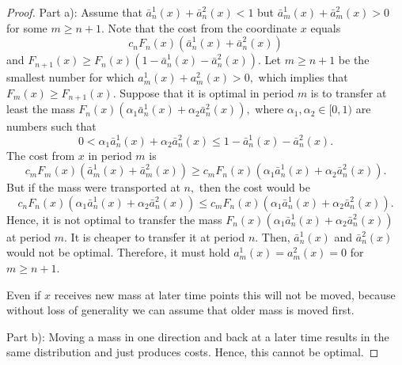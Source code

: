 \documentclass[10pt,a4paper]{amsart}
\begin{document}
\begin{proof} Part a): 
Assume that $\bar a_n^1(x)+\bar a_n^2(x)< 1$
but $\bar a_m^1(x)+\bar a_m^2(x)>0$
for some $m\ge n+1.$ Note that the cost from the coordinate $x$ equals
$$c_nF_n(x)(\bar a_n^1(x)+\bar a_n^2(x))$$
and $F_{n+1}(x)\ge F_n(x)(1-\bar a_n^1(x)-\bar a_n^2(x)).$   Let $m\ge n+1$ be the smallest  number for which
$a_m^1(x)+a^2_m(x)>0,$ which implies that $F_m(x)\ge F_{n+1}(x).$ 
Suppose that it is optimal in period $m$ is to transfer at least the mass $F_n(x)(\alpha_1\bar a_n^1(x)+\alpha_2\bar a_n^2(x)),$ where $\alpha_1,\alpha_2\in [0,1)$ are numbers such that 
$$0<\alpha_1\bar a_n^1(x)+\alpha_2\bar a_n^2(x)\le 1-
\bar a_n^1(x)-\bar a_n^2(x).$$
The cost from $x$ in period $m$ is 
$$c_mF_m(x)(\bar a_m^1(x)+\bar a_m^2(x))\ge
c_m F_n(x)(\alpha_1\bar a_n^1(x)+\alpha_2\bar a_n^2(x)).
$$
But if the mass were transported at $n,$ then the cost would be 
 $$c_n F_n(x)(\alpha_1 \bar a_n^1(x)+\alpha_2 \bar a_n^2(x))\le c_m  F_n(x)(\alpha_1\bar a_n^1(x)+\alpha_2\bar a_n^2(x)).$$
 Hence, it is not optimal  to transfer the mass 
 $F_n(x)(\alpha_1 \bar a_n^1(x)+\alpha_2 \bar a_n^2(x))$ at period $m.$ 
 It is cheaper to transfer it at period $n$. Then, 
 $\bar a^1_n(x)$ and $\bar a^2_n(x)$ would not be optimal.
 Therefore, it must hold $a_m^1(x)=a^2_m(x)=0$ for 
 $m\ge n+1.$

 Even if $x$ receives new mass at later time 
points this will not be moved, because without 
loss of generality we can assume that older 
mass is moved first.





Part b): Moving a mass in one direction and 
back at a later time results in the same 
distribution and just produces costs. Hence, 
this cannot be optimal.
\end{proof}
\end{document}
